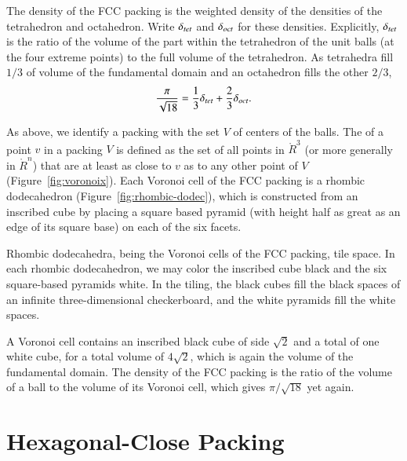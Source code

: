 \figSEYIMIE %

\figAZGXQWC %

The density of the FCC packing is the weighted density
of the densities of the tetrahedron and octahedron.  Write $\delta_{tet}$ and
$\delta_{oct}$ for these densities.  Explicitly, $\delta_{tet}$ is the ratio of the
volume of the part within the tetrahedron of the unit balls (at the
four extreme points) to the full volume of the tetrahedron.  As tetrahedra fill
$1/3$ of volume of the fundamental domain and an octahedron fills
the other $2/3$,
\[ 
  \frac{\pi}{\sqrt{18}} = \frac{1}{3}\delta_{tet} + \frac{2}{3}\delta_{oct}.
\] 

As above, we identify a packing with the set $V$ of centers of the
balls.  The  
of a point $v$ in a packing $V$ is
defined as the set of all points in $\ring{R}^3$ (or more generally in
$\ring{R}^n$) that are at least as close to $v$ as to any other point
of $V$ (Figure~\ref{fig:voronoix}).  Each Voronoi cell of the FCC
packing is a rhombic dodecahedron
(Figure~\ref{fig:rhombic-dodec}),
which is constructed from an inscribed cube by placing a square based pyramid
(with height half as great as an edge of its square base) on each of
the six facets.

%

\figEVIAIQPx %

\figPQJIJGE %

Rhombic dodecahedra, being the Voronoi cells of the FCC packing, tile space.
In each rhombic dodecahedron, we 
may color the inscribed cube black and the six square-based pyramids
white.  In the tiling, 
the black cubes fill the black spaces of an infinite three-dimensional
checkerboard, and the white pyramids fill the white spaces.

A Voronoi cell contains an inscribed black cube of side $\sqrt2$ and a total
of one white cube, for a total volume of $4\sqrt2$, which is
again the volume of the fundamental domain.  The density of the
FCC packing is the ratio of the volume of a ball to the volume
of its Voronoi cell, which gives $\pi/\sqrt{18}$ yet again.



\section{Hexagonal-Close Packing}\label{sec:hcp}

